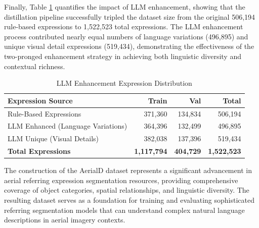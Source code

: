 Finally, Table \ref{tab:llm_enhancement_stats} quantifies the impact of LLM enhancement, showing that the distillation pipeline successfully tripled the dataset size from the original 506,194 rule-based expressions to 1,522,523 total expressions. The LLM enhancement process contributed nearly equal numbers of language variations (496,895) and unique visual detail expressions (519,434), demonstrating the effectiveness of the two-pronged enhancement strategy in achieving both linguistic diversity and contextual richness.

\begin{table}[H]
\centering
\caption{LLM Enhancement Expression Distribution}
\label{tab:llm_enhancement_stats}
\begin{tabular}{@{}lrrr@{}}
\toprule
\textbf{Expression Source} & \textbf{Train} & \textbf{Val} & \textbf{Total} \\
\midrule
Rule-Based Expressions & 371,360 & 134,834 & 506,194 \\
LLM Enhanced (Language Variations) & 364,396 & 132,499 & 496,895 \\
LLM Unique (Visual Details) & 382,038 & 137,396 & 519,434 \\
\midrule
\textbf{Total Expressions} & \textbf{1,117,794} & \textbf{404,729} & \textbf{1,522,523} \\
\bottomrule
\end{tabular}
\end{table}

The construction of the AerialD dataset represents a significant advancement in aerial referring expression segmentation resources, providing comprehensive coverage of object categories, spatial relationships, and linguistic diversity. The resulting dataset serves as a foundation for training and evaluating sophisticated referring segmentation models that can understand complex natural language descriptions in aerial imagery contexts.
